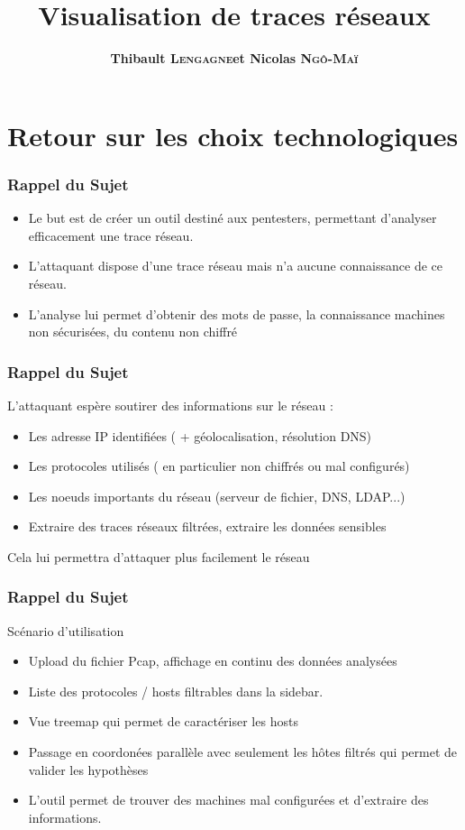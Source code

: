 \documentclass{beamer}
\title[Visualisation de traces réseaux]{Visualisation de traces réseaux}
\author{\textbf{Thibault \textsc{Lengagne}et Nicolas \textsc{Ngô-Maï}}}
\institute{Centrale Supélec - Campus de Rennes}
\begin{document}
  \begin{frame}
    \titlepage
  \end{frame}
  

 \section{Retour sur les choix technologiques}
  \begin{frame}
    \frametitle{Rappel du Sujet}
    \begin{itemize}
     \item Le but est de créer un outil destiné aux pentesters, permettant d'analyser efficacement une trace réseau.
     \item L'attaquant dispose d'une trace réseau mais n'a aucune connaissance de ce réseau.
     \item L'analyse lui permet d'obtenir des mots de passe, la connaissance machines non sécurisées, du contenu non chiffré
    \end{itemize}
  \end{frame}
  
   \begin{frame}
    \frametitle{Rappel du Sujet}
    L'attaquant espère soutirer des informations sur le réseau :
    \begin{itemize}
      \item Les adresse IP identifiées ( + géolocalisation, résolution DNS)
      \item Les protocoles utilisés ( en particulier non chiffrés ou mal configurés)
      \item Les noeuds importants du réseau (serveur de fichier, DNS, LDAP...)
      \item Extraire des traces réseaux filtrées, extraire les données sensibles
    \end{itemize}
    Cela lui permettra d'attaquer plus facilement le réseau
  \end{frame}
  
  \begin{frame}
  \frametitle{Rappel du Sujet}
    Scénario d'utilisation
    \begin{itemize}
     \item Upload du fichier Pcap, affichage en continu des données analysées
     \item Liste des protocoles / hosts filtrables dans la sidebar.
     \item Vue treemap qui permet de caractériser les hosts
     \item Passage en coordonées parallèle avec seulement les hôtes filtrés qui permet de valider les hypothèses
     \item L'outil permet de trouver des machines mal configurées et d'extraire des informations.
    \end{itemize}
  \end{frame}
\end{document}
